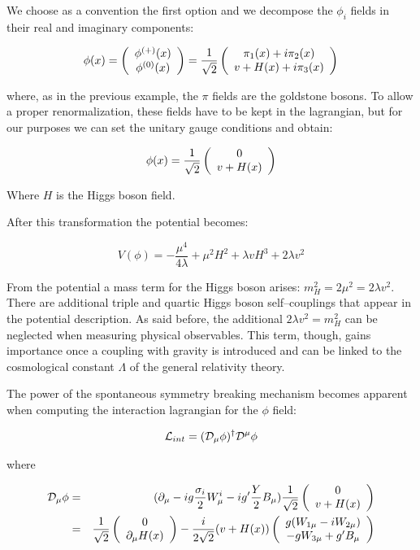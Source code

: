 We choose as a convention the first option and we decompose the $\phi_i$ fields in their real and imaginary components:

\begin{equation}
\phi(x) = \left(\begin{array}{c}\phi^{(+)}(x) \\\phi^{(0)}(x)\end{array}\right) = \dfrac{1}{\sqrt{2}} \left(\begin{array}{c} \pi_1(x) + i \pi_2(x)  \\ v + H(x) + i \pi_3(x) \end{array}\right)
\end{equation}

where, as in the previous example, the $\pi$ fields are the goldstone bosons.  To allow a proper renormalization, these fields have to be kept in the lagrangian, but for our purposes we can set the unitary gauge conditions and obtain:

\begin{equation}
\phi(x) = \dfrac{1}{\sqrt{2}} \left(\begin{array}{c} 0  \\ v + H(x) \end{array}\right)
\end{equation}

Where $H$ is the Higgs boson field.

After this transformation the potential becomes:

\begin{equation}
V(\phi) = -\dfrac{\mu^4}{4\lambda} + \mu^2H^2 + \lambda v H^3 + 2 \lambda v^2
\end{equation}

From the potential a mass term for the Higgs boson arises: $m^{2}_H = 2\mu^2 = 2 \lambda v^2$. There are additional triple and quartic Higgs boson self--couplings that appear in the potential description. As said before, the additional $2 \lambda v^2 = m^{2}_H$ can be neglected when measuring physical observables. This term, though, gains importance once a coupling with gravity is introduced and can be linked to the cosmological constant $\Lambda$ of the general relativity theory.

The power of the spontaneous symmetry breaking mechanism becomes apparent when computing the interaction lagrangian for the $\phi$ field:

\begin{equation}
\mathcal{L}_{int} = (\mathcal{D}_\mu\phi)^\dagger\mathcal{D}^\mu\phi
\end{equation}

where

\begin{eqnarray}
\mathcal{D}_\mu \phi &=& (\partial_\mu - ig\dfrac{\sigma_i}{2}W^i_\mu - ig'\dfrac{Y}{2}B_\mu) \dfrac{1}{\sqrt{2}} \left(\begin{array}{c}0 \\v+H(x)\end{array}\right) \nonumber \\
&=& \dfrac{1}{\sqrt{2}} \left(\begin{array}{c}0 \\\partial_\mu H(x)\end{array}\right) - \dfrac{i}{2\sqrt{2}} (v+H(x)) \left(\begin{array}{c}g(W_{1\mu} - i W_{2\mu}) \\-g W_{3\mu} + g'B_\mu\end{array}\right)
\end{eqnarray}

